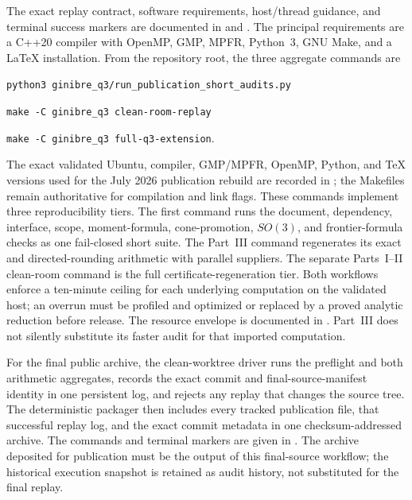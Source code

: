 \documentclass[11pt,reqno]{amsart}
\theoremstyle{plain}
\theoremstyle{definition}
\begin{document}
The exact replay contract, software requirements, host/thread guidance, and
terminal success markers are documented in  and
.  The principal requirements are a
C++20 compiler with OpenMP, GMP, MPFR, Python~3, GNU Make, and a \LaTeX{}
installation.  From the repository root, the three aggregate commands are
\begin{center}
\texttt{python3 ginibre\_q3/run\_publication\_short\_audits.py}

\texttt{make -C ginibre\_q3 clean-room-replay}

\texttt{make -C ginibre\_q3 full-q3-extension}.
\end{center}
The exact validated Ubuntu, compiler, GMP/MPFR, OpenMP, Python, and \TeX{}
versions used for the July 2026 publication rebuild are recorded in
; the Makefiles remain authoritative for compilation and
link flags.
These commands implement three reproducibility tiers.  The first command runs
the document, dependency, interface, scope, moment-formula, cone-promotion,
$SO(3)$, and frontier-formula checks as one fail-closed short suite.  The
Part~III command regenerates its exact and directed-rounding arithmetic with
parallel suppliers.  The separate Parts~I--II clean-room command is the full
certificate-regeneration tier.  Both workflows enforce a ten-minute ceiling
for each underlying computation on the validated host; an overrun must be
profiled and optimized or replaced by a proved analytic reduction before
release.  The resource envelope is documented in .  Part~III
does not silently substitute its faster audit for that imported computation.

For the final public archive, the clean-worktree driver
 runs the preflight and both arithmetic
aggregates, records the exact commit and final-source-manifest identity in one
persistent log, and rejects any replay that changes the source tree.  The
deterministic packager  then includes
every tracked publication file, that successful replay log, and the exact
commit metadata in one checksum-addressed archive.  The commands and terminal
markers are given in .  The archive deposited for publication
must be the output of this final-source workflow; the historical execution
snapshot is retained as audit history, not substituted for the final replay.
\end{document}

